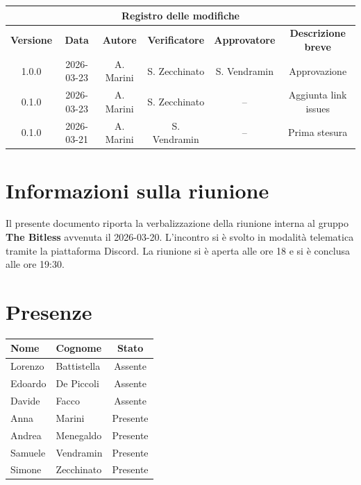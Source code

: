 \documentclass[a4paper, 10pt, colorlinks=true, linkcolor=black, urlcolor=blue, citecolor=blue, hidelinks]{article}
\begin{document}
\newcommand{\tipoverbale}{interno}
\newcommand{\dataverbale}{2026-03-20}
\newcommand{\dataversione}{2026-03-23}
\newcommand{\versione}{1.0.0}
\newcommand{\stato}{Approvato}
\newcommand{\destinatari}{The Bitless, prof. Tullio Vardanega, prof. Riccardo Cardin}

\begin{titlepage}

\end{titlepage}

\newpage
{}

\begin{center}
    \begin{tabular}{|c|c|c|c|c|c|}
        \hline
        \multicolumn{6}{|c|}{\textbf{Registro delle modifiche}} \\
        \hline
        \textbf{Versione} & \textbf{Data} & \textbf{Autore} & \textbf{Verificatore} & \textbf{Approvatore} & \textbf{Descrizione breve} \\
        \hline
        1.0.0 & 2026-03-23 & A. Marini & S. Zecchinato & S. Vendramin & Approvazione \\
        \hline
        0.1.0 & 2026-03-23 & A. Marini & S. Zecchinato & -- & Aggiunta link issues \\
        \hline
        0.1.0 & 2026-03-21 & A. Marini & S. Vendramin & -- & Prima stesura \\
        \hline
    \end{tabular}
\end{center}


\newpage
\tableofcontents 

\newpage
\section{Informazioni sulla riunione}
Il presente documento riporta la verbalizzazione della riunione interna al gruppo \textbf{The Bitless} avvenuta il \dataverbale{}. L'incontro si è svolto in modalità telematica tramite la piattaforma Discord. La riunione si è aperta alle ore 18 e si è conclusa alle ore 19:30.

\section{Presenze}
\begin{center}
\begin{tabular}{|l|l|c|}
\hline
\textbf{Nome} & \textbf{Cognome} & \textbf{Stato} \\
\hline
Lorenzo & Battistella & Assente \\
Edoardo & De Piccoli & Assente \\
Davide & Facco & Assente \\
Anna & Marini & Presente \\
Andrea & Menegaldo & Presente \\
Samuele & Vendramin & Presente \\
Simone & Zecchinato & Presente \\
\hline
\end{tabular}
\end{center}
\end{document}
